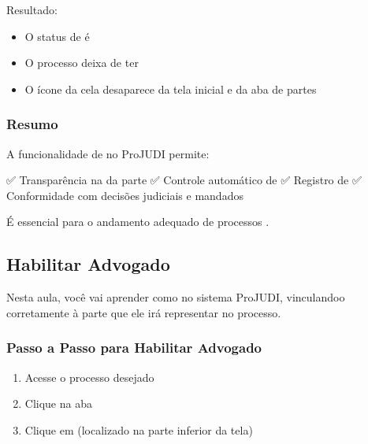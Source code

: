 \documentclass[letterpaper,10pt,brazil]{sphinxmanual}
\begin{document}
\sphinxAtStartPar
Resultado:
\begin{itemize}
\item {} 
\sphinxAtStartPar
O status de  é 

\item {} 
\sphinxAtStartPar
O processo deixa de ter 

\item {} 
\sphinxAtStartPar
O ícone da cela desaparece da tela inicial e da aba de partes

\end{itemize}


\subsubsection{Resumo}
\label{\detokenize{projud_25_cadastro reupreso:resumo}}
\sphinxAtStartPar
A funcionalidade de  no ProJUDI permite:

\sphinxAtStartPar
✅ Transparência na  da parte
✅ Controle automático de 
✅ Registro de 
✅ Conformidade com decisões judiciais e mandados

\sphinxAtStartPar
É essencial para o andamento adequado de processos .

\sphinxstepscope


\subsection{Habilitar Advogado}
\label{\detokenize{projud_26_habilitaradvogado:habilitar-advogado}}\label{\detokenize{projud_26_habilitaradvogado::doc}}
\sphinxAtStartPar
Nesta aula, você vai aprender como  no sistema ProJUDI, vinculando\sphinxhyphen{}o corretamente à parte que ele irá representar no processo.


\subsubsection{Passo a Passo para Habilitar Advogado}
\label{\detokenize{projud_26_habilitaradvogado:passo-a-passo-para-habilitar-advogado}}\begin{enumerate}
%
\item {} 
\sphinxAtStartPar
Acesse o processo desejado

\item {} 
\sphinxAtStartPar
Clique na aba 

\item {} 
\sphinxAtStartPar
Clique em  (localizado na parte inferior da tela)

\end{enumerate}
\end{document}
